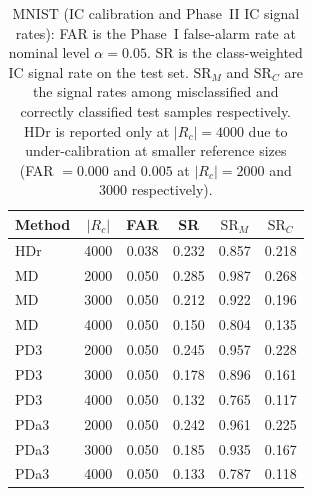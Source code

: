\begin{table}[htbp]
\centering
\caption{MNIST (IC calibration and Phase~II IC signal rates):
FAR is the Phase~I false-alarm rate at nominal level $\alpha=0.05$.
SR is the class-weighted IC signal rate on the test set.
$\mathrm{SR}_M$ and $\mathrm{SR}_C$ are the signal rates among
misclassified and correctly classified test samples respectively.
HDr is reported only at $|R_c|=4000$ due to under-calibration
at smaller reference sizes (FAR $=0.000$ and $0.005$
at $|R_c|=2000$ and $3000$ respectively).}
\label{tab:mnist-far-sr}
\small
{}
\begin{tabular}{l c
  S[table-format=1.3] S[table-format=1.3]
  S[table-format=1.3] S[table-format=1.3]}
\toprule
Method & $|R_c|$ & {FAR} & {SR}
  & {$\mathrm{SR}_M$} & {$\mathrm{SR}_C$} \\
\midrule
  HDr & 4000 & 0.038 & 0.232 & 0.857 & 0.218 \\
\addlinespace
  MD & 2000 & 0.050 & 0.285 & 0.987 & 0.268 \\
  MD & 3000 & 0.050 & 0.212 & 0.922 & 0.196 \\
  MD & 4000 & 0.050 & 0.150 & 0.804 & 0.135 \\
\addlinespace
  PD3 & 2000 & 0.050 & 0.245 & 0.957 & 0.228 \\
  PD3 & 3000 & 0.050 & 0.178 & 0.896 & 0.161 \\
  PD3 & 4000 & 0.050 & 0.132 & 0.765 & 0.117 \\
\addlinespace
  PDa3 & 2000 & 0.050 & 0.242 & 0.961 & 0.225 \\
  PDa3 & 3000 & 0.050 & 0.185 & 0.935 & 0.167 \\
  PDa3 & 4000 & 0.050 & 0.133 & 0.787 & 0.118 \\
\bottomrule
\end{tabular}
\end{table}
